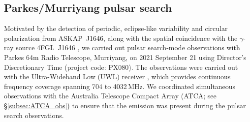 \documentclass[fleqn,usenatbib]{mnras}
\newcommand{\todo}[1]{\textcolor{red}{TODO: #1}\PackageWarning{TODO:}{#1!}}
\newcommand{\blinky}{{4FGL}~J1646}
\newcommand{\blinkyaskap}{{ASKAP}~J1646}
\begin{document}
\subsection{Parkes/Murriyang pulsar search}
Motivated by the detection of periodic, eclipse-like variability and circular polarization from \blinkyaskap{}, along with the spatial coincidence with the $\gamma$-ray source \blinky{} \citep{2018MNRAS.475..942F}, we carried out pulsar search-mode observations with Parkes 64m Radio Telescope, Murriyang, on 2021 September 21 using Director's Discretionary Time (project code: PX080). The observations were carried out with the Ultra-Wideband Low (UWL) receiver \citep{2020PASA...37...12H}, which provides continuous frequency coverage spanning 704 to 4032\,MHz. We coordinated simultaneous observations with the Australia Telescope Compact Array (ATCA; see \S\ref{subsec:ATCA_obs}) to ensure that the emission was present during the pulsar search observations.

\end{document}
